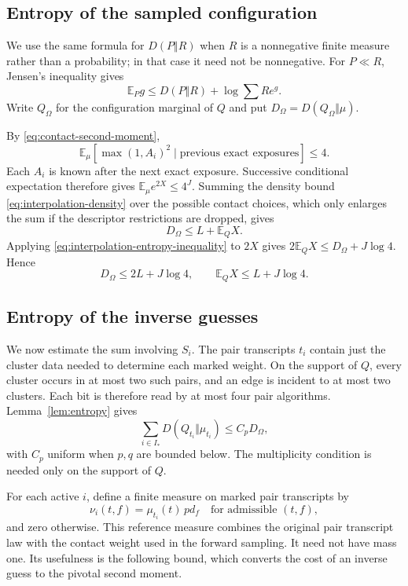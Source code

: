 \documentclass[11pt]{article}
\theoremstyle{definition}
\newcommand{\EE}{\mathbb E}
\begin{document}
\subsection{Entropy of the sampled configuration}

We use the same formula for $D(P\Vert R)$ when $R$ is a nonnegative finite
measure rather than a probability; in that case it need not be
nonnegative. For $P\ll R$, Jensen's inequality gives
\begin{equation}\label{eq:interpolation-entropy-inequality}
 \EE_P g\le D(P\Vert R)+\log\sum R e^g.
\end{equation}
Write $Q_\Omega$ for the configuration marginal of $Q$ and put
$D_\Omega=D(Q_\Omega\Vert\mu)$.

By \eqref{eq:contact-second-moment},
\[
 \EE_\mu[\max(1,A_i)^2\mid\text{previous exact exposures}]\le4.
\]
Each $A_i$ is known after the next exact exposure. Successive conditional
expectation therefore gives
$\EE_\mu e^{2X}\le4^J$. Summing the density bound
\eqref{eq:interpolation-density} over the possible contact choices,
which only enlarges the sum if the descriptor restrictions are dropped,
gives
\[
 D_\Omega\le L+\EE_Q X.
\]
Applying \eqref{eq:interpolation-entropy-inequality} to $2X$ gives
$2\EE_Q X\le D_\Omega+J\log4$. Hence
\begin{equation}\label{eq:interpolation-configuration-entropy}
 D_\Omega\le2L+J\log4,
 \qquad \EE_Q X\le L+J\log4.
\end{equation}

\subsection{Entropy of the inverse guesses}

We now estimate the sum involving $S_i$. The pair transcripts $t_i$
contain just the cluster data needed to determine each marked weight.
On the support of $Q$, every cluster occurs in at most two such pairs,
and an edge is incident to at most two clusters. Each bit is therefore
read by at most four pair algorithms. Lemma~\ref{lem:entropy} gives
\begin{equation}\label{eq:interpolation-pair-entropy}
 \sum_{i\in I_*}D(Q_{t_i}\Vert\mu_{t_i})\le C_pD_\Omega,
\end{equation}
with $C_p$ uniform when $p,q$ are bounded below. The multiplicity
condition is needed only on the support of $Q$.

For each active $i$, define a finite measure on marked pair transcripts by
\[
 \nu_i(t,f)=\mu_{t_i}(t)\,pd_f
 \quad\text{for admissible }(t,f),
\]
and zero otherwise. This reference measure combines the original pair
transcript law with the contact weight used in the forward sampling.
It need not have mass one. Its usefulness is the following bound, which
converts the cost of an inverse guess to the pivotal second moment.
\end{document}
